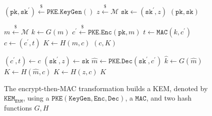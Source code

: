 \documentclass[runningheads]{llncs}
\newcommand{\pke}{\texttt{PKE}}
\newcommand{\keygen}{\texttt{KeyGen}}
\newcommand{\encrypt}{\texttt{Enc}}
\newcommand{\decrypt}{\texttt{Dec}}
\newcommand{\kem}{\texttt{KEM}}
\newcommand{\encap}{\texttt{Encap}}
\newcommand{\decap}{\texttt{Decap}}
\newcommand{\etm}{\texttt{EtM}}  %
\newcommand{\mac}{\texttt{MAC}}
\newcommand{\pk}{\texttt{pk}}
\newcommand{\sk}{\texttt{sk}}
\newcommand{\leftsample}{\stackrel{\$}{\leftarrow}}
\begin{document}
\begin{figure}[h]
    \centering
    \begin{minipage}[t]{0.5\textwidth}
        \begin{algorithm}[H]
            \caption*{$\kem_\etm.\keygen()$}
            \begin{algorithmic}[1]
                \State $(\pk, \sk^\prime) \leftsample \pke\texttt{.}\keygen()$
                \State $z \leftsample \mathcal{M}$
                \State $\sk \leftarrow (\sk^\prime, z)$
                \State \Return $(\pk, \sk)$
            \end{algorithmic}
        \end{algorithm}
        \begin{algorithm}[H]
            \caption*{$\kem_\etm.\encap(\pk)$}
            \begin{algorithmic}[1]
                \State $m \leftsample \mathcal{M}$
                \State $k \leftarrow G(m)$
                \State $c^\prime \leftsample \pke\texttt{.}\encrypt(\pk, m)$
                \State $t \leftarrow \mac(k, c^\prime)$
                \State $c \leftarrow (c^\prime, t)$
                \State $K \leftarrow H(m, c)$
                \State \Return $(c, K)$
            \end{algorithmic}
        \end{algorithm}
    \end{minipage}\hfill
    \begin{minipage}[t]{0.49\textwidth}
        \begin{algorithm}[H]
            \caption*{$\kem_\etm.\decap(\sk, c)$}
            \begin{algorithmic}[1]
                \State $(c^\prime, t) \leftarrow c$
                \State $(\sk^\prime, z) \leftarrow \sk$
                \State $\hat{m} \leftarrow \pke\texttt{.}\decrypt(\sk^\prime, c^\prime)$
                \State $\hat{k} \leftarrow G(\hat{m})$
                \If{$\mac(\hat{k}, c^\prime) = t$}
                    \State $K \leftarrow H(\hat{m}, c)$
                \Else
                    \State $K \leftarrow H(z, c)$
                \EndIf
                \State \Return $K$
            \end{algorithmic}
        \end{algorithm}
    \end{minipage}
    \caption{The encrypt-then-MAC transformation builds a KEM, denoted by $\kem_\etm$, using a $\pke(\keygen, \encrypt, \decrypt)$, a $\mac$, and two hash functions $G, H$}\label{fig:etm-routines} 
\end{figure}
\end{document}
